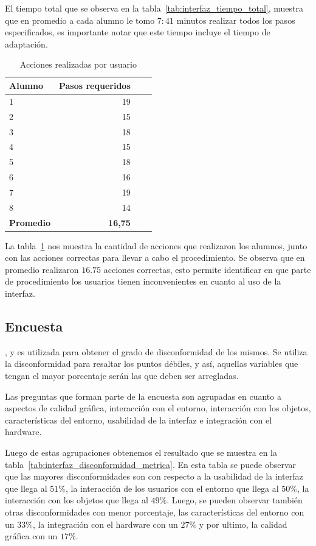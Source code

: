 El tiempo total que se observa en la tabla~\ref{tab:interfaz_tiempo_total},
muestra que en promedio a cada alumno le tomo $7:41$ minutos realizar todos los
pasos especificados, es importante notar que este tiempo incluye el tiempo de
adaptación. 



\begin{table}[!hbt]
\centering
\begin{tabular}{lrrr}
\toprule
\textbf{Alumno} & \textbf{Pasos requeridos} \\
\midrule
1 & 19 \\
2 & 15 \\
3 & 18 \\
4 & 15 \\
5 & 18 \\
6 & 16 \\
7 & 19 \\
8 & 14 \\
\midrule
\textbf{Promedio} & \textbf{16,75} \\
\bottomrule
\end{tabular}
\caption{Acciones realizadas por usuario}
\label{tab:interfaz_acciones}
\end{table}

La tabla~\ref{tab:interfaz_acciones} nos muestra la cantidad de acciones que
realizaron los alumnos, junto con las acciones correctas para llevar a cabo el
procedimiento. Se observa que en promedio realizaron $16.75$ acciones correctas,
esto permite identificar en que parte de procedimiento los usuarios tienen
inconvenientes en cuanto al uso de la interfaz.

\subsection{Encuesta}

, y es utilizada para obtener el grado de
disconformidad de los mismos. Se utiliza la disconformidad para resaltar los
puntos débiles, y así, aquellas variables que tengan el mayor porcentaje serán
las que deben ser arregladas.

Las preguntas que forman parte de la  encuesta son agrupadas en cuanto a
aspectos de calidad gráfica, interacción con el entorno, interacción con los
objetos, características del entorno, usabilidad de la interfaz e integración
con el hardware.

Luego de estas agrupaciones obtenemos el resultado que se muestra en la
tabla~\ref{tab:interfaz_disconformidad_metrica}. En esta tabla se puede observar
que las mayores disconformidades son con respecto a la usabilidad de la interfaz
que llega al $51\%$, la interacción de los usuarios con el entorno que llega al
$50\%$, la interacción con los objetos que llega al $49\%$. Luego, se pueden
observar también otras disconformidades con menor porcentaje, las
características del entorno con un  $33\%$, la integración con el hardware con
un  $27\%$ y por ultimo, la calidad gráfica con un  $17\%$.

